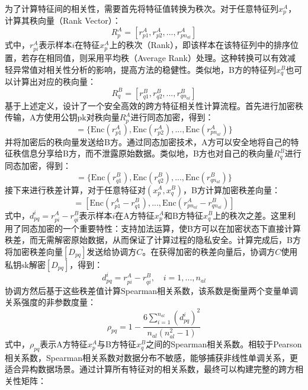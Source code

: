 为了计算特征间的相关性，需要首先将特征值转换为秩次。对于任意特征列$x^A_p$，计算其秩向量（Rank Vector）：
\begin{equation}
	R^A_p = [r^A_{p1}, r^A_{p2}, ..., r^A_{pn_{al}}]
\end{equation}
式中，$r^A_{pi}$表示样本$i$在特征$x^A_p$上的秩次（Rank），即该样本在该特征列中的排序位置，若存在相同值，则采用平均秩（Average Rank）处理。这种转换可以有效减轻异常值对相关性分析的影响，提高方法的稳健性。类似地，B方的特征列$x^B_q$也可以计算出对应的秩向量：
\begin{equation}
	R^B_q = [r^B_{q1}, r^B_{q2}, ..., r^B_{qn_{al}}]
\end{equation}
基于上述定义，设计了一个安全高效的跨方特征相关性计算流程。首先进行加密秩传输，A方使用公钥$\text{pk}$对秩向量$R^A_p$进行同态加密，得到：
\begin{equation}
	[R^A_p] = \{\text{Enc}(r^A_{p1}), \text{Enc}(r^A_{p2}), ..., \text{Enc}(r^A_{pn_{al}})\}
\end{equation}
并将加密后的秩向量发送给B方。通过同态加密技术，A方可以安全地将自己的特征秩信息分享给B方，而不泄露原始数据。类似地，B方也对自己的秩向量$R^B_q$进行同态加密，得到：
\begin{equation}
	[R^B_q] = \{\text{Enc}(r^B_{q1}), \text{Enc}(r^B_{q2}), ..., \text{Enc}(r^B_{qn_{al}})\}
\end{equation}
接下来进行秩差计算，对于任意特征对$(x^A_p, x^B_q)$，B方计算加密秩差向量：
\begin{equation}
	[D_{pq}] = \left[ \text{Enc}(r^A_{p1} - r^B_{q1}), ..., \text{Enc}(r^A_{pn_{al}} - r^B_{qn_{al}}) \right]
\end{equation}
式中，$d_{pq}^i = r^A_{pi} - r^B_{qi}$表示样本$i$在A方特征$x^A_p$和B方特征$x^B_q$上的秩次之差。这里利用了同态加密的一个重要特性：支持加法运算，使B方可以在加密状态下直接计算秩差，而无需解密原始数据，从而保证了计算过程的隐私安全。计算完成后，B方将加密秩差向量$[D_{pq}]$发送给协调方$C$。在获得加密的秩差向量后，协调方$C$使用私钥$\text{sk}$解密$[D_{pq}]$，得到：
\begin{equation}
	d_{pq}^i = r^A_{pi} - r^B_{qi}, \quad i = 1, ..., n_{al}
\end{equation}
协调方然后基于这些秩差值计算Spearman相关系数，该系数是衡量两个变量单调关系强度的非参数度量：
\begin{equation}
	\rho_{pq} = 1 - \frac{6\sum_{i=1}^{n_{al}} (d_{pq}^i)^2}{n_{al}(n_{al}^2 - 1)}
\end{equation}
式中，$\rho_{pq}$表示A方特征$x^A_p$与B方特征$x^B_q$之间的Spearman相关系数。相较于Pearson相关系数，Spearman相关系数对数据分布不敏感，能够捕获非线性单调关系，更适合异构数据场景。通过计算所有特征对的相关系数，最终可以构建完整的跨方相关性矩阵：
